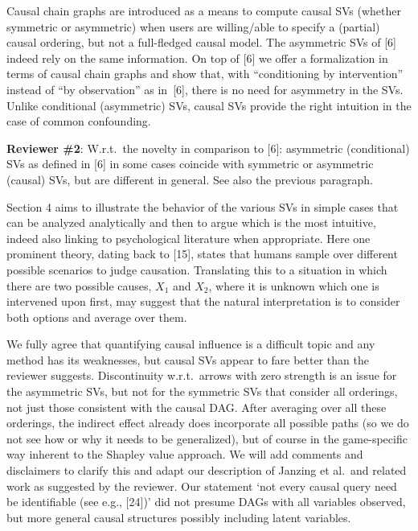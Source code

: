 \documentclass{article}
\begin{document}
Causal chain graphs are introduced as a means to compute causal SVs (whether symmetric or asymmetric) when users are willing/able to specify a (partial) causal ordering, but not a full-fledged causal model. The asymmetric SVs of [6] indeed rely on the same information. On top of [6] we offer a formalization in terms of causal chain graphs and show that, with ``conditioning by intervention'' instead of ``by observation'' as in~[6], there is no need for asymmetry in the SVs. Unlike conditional (asymmetric) SVs, causal SVs provide the right intuition in the case of common confounding.

{\bf Reviewer \#2}: W.r.t.\ the novelty in comparison to [6]: asymmetric (conditional) SVs as defined in [6] in some cases coincide with symmetric or asymmetric (causal) SVs, but are different in general. See also the previous paragraph.

Section 4 aims to illustrate the behavior of the various SVs in simple cases that can be analyzed analytically and then to argue which is the most intuitive, indeed also linking to psychological literature when appropriate. Here one prominent theory, dating back to [15], states that humans sample over different possible scenarios to judge causation. Translating this to a situation in which there are two possible causes, $X_1$ and $X_2$, where it is unknown which one is intervened upon first, may suggest that the natural interpretation is to consider both options and average over them.

We fully agree that quantifying causal influence is a difficult topic and any method has its weaknesses, but causal SVs appear to fare better than the reviewer suggests. Discontinuity w.r.t.\ arrows with zero strength is an issue for the asymmetric SVs, but not for the symmetric SVs that consider all orderings, not just those consistent with the causal DAG. After averaging over all these orderings, the indirect effect already does incorporate all possible paths (so we do not see how or why it needs to be generalized), but of course in the game-specific way inherent to the Shapley value approach. We will add comments and disclaimers to clarify this and adapt our description of Janzing et al.\ and related work as suggested by the reviewer. Our statement `not every causal query need be identifiable (see e.g., [24])' did not presume DAGs with all variables observed, but more general causal structures possibly including latent variables.
\end{document}
